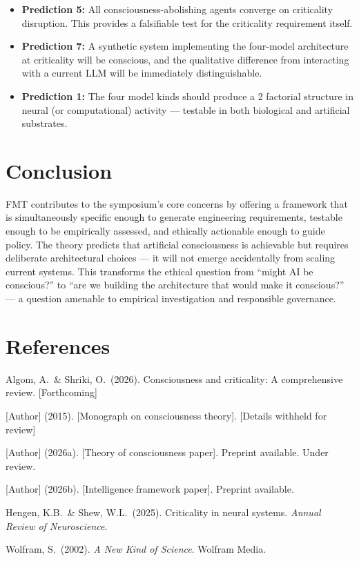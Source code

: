 \documentclass[11pt,a4paper]{article}
\begin{document}
\begin{itemize}
\item \textbf{Prediction 5:} All consciousness-abolishing agents converge on criticality disruption. This provides a falsifiable test for the criticality requirement itself.

\item \textbf{Prediction 7:} A synthetic system implementing the four-model architecture at criticality will be conscious, and the qualitative difference from interacting with a current LLM will be immediately distinguishable.

\item \textbf{Prediction 1:} The four model kinds should produce a 2 factorial structure in neural (or computational) activity --- testable in both biological and artificial substrates.
\end{itemize}

\section{Conclusion}

FMT contributes to the symposium's core concerns by offering a framework that is simultaneously specific enough to generate engineering requirements, testable enough to be empirically assessed, and ethically actionable enough to guide policy. The theory predicts that artificial consciousness is achievable but requires deliberate architectural choices --- it will not emerge accidentally from scaling current systems. This transforms the ethical question from ``might AI be conscious?'' to ``are we building the architecture that would make it conscious?'' --- a question amenable to empirical investigation and responsible governance.

\section*{References}

\begingroup
\setlength{\parindent}{-1.5em}
\setlength{\leftskip}{1.5em}
\setlength{\parskip}{4pt plus 1pt minus 1pt}

Algom, A.\ \& Shriki, O.\ (2026). Consciousness and criticality: A comprehensive review. [Forthcoming]

{[Author]} (2015). [Monograph on consciousness theory]. [Details withheld for review]

{[Author]} (2026a). [Theory of consciousness paper]. Preprint available. Under review.

{[Author]} (2026b). [Intelligence framework paper]. Preprint available.

Hengen, K.B.\ \& Shew, W.L.\ (2025). Criticality in neural systems. \textit{Annual Review of Neuroscience}.

Wolfram, S.\ (2002). \textit{A New Kind of Science}. Wolfram Media.

\endgroup
\end{document}
